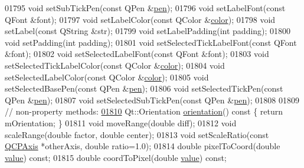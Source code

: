\begin{DoxyCode}
01795   \textcolor{keywordtype}{void} setSubTickPen(\textcolor{keyword}{const} QPen &\hyperlink{a00116_a1f13fffa0a0faac34ec342973e613a4a}{pen});
01796   \textcolor{keywordtype}{void} setLabelFont(\textcolor{keyword}{const} QFont &font);
01797   \textcolor{keywordtype}{void} setLabelColor(\textcolor{keyword}{const} QColor &\hyperlink{a00116_ae35093fbf4f645dcefd930ca8c68b622}{color});
01798   \textcolor{keywordtype}{void} setLabel(\textcolor{keyword}{const} QString &str);
01799   \textcolor{keywordtype}{void} setLabelPadding(\textcolor{keywordtype}{int} padding);
01800   \textcolor{keywordtype}{void} setPadding(\textcolor{keywordtype}{int} padding);
01801   \textcolor{keywordtype}{void} setSelectedTickLabelFont(\textcolor{keyword}{const} QFont &font);
01802   \textcolor{keywordtype}{void} setSelectedLabelFont(\textcolor{keyword}{const} QFont &font);
01803   \textcolor{keywordtype}{void} setSelectedTickLabelColor(\textcolor{keyword}{const} QColor &\hyperlink{a00116_ae35093fbf4f645dcefd930ca8c68b622}{color});
01804   \textcolor{keywordtype}{void} setSelectedLabelColor(\textcolor{keyword}{const} QColor &\hyperlink{a00116_ae35093fbf4f645dcefd930ca8c68b622}{color});
01805   \textcolor{keywordtype}{void} setSelectedBasePen(\textcolor{keyword}{const} QPen &\hyperlink{a00116_a1f13fffa0a0faac34ec342973e613a4a}{pen});
01806   \textcolor{keywordtype}{void} setSelectedTickPen(\textcolor{keyword}{const} QPen &\hyperlink{a00116_a1f13fffa0a0faac34ec342973e613a4a}{pen});
01807   \textcolor{keywordtype}{void} setSelectedSubTickPen(\textcolor{keyword}{const} QPen &\hyperlink{a00116_a1f13fffa0a0faac34ec342973e613a4a}{pen});
01808   
01809   \textcolor{comment}{// non-property methods:}
\hypertarget{a00116_source_l01810}{}\hyperlink{a00025_a57483f2f60145ddc9e63f3af53959265}{01810}   Qt::Orientation \hyperlink{a00025_a57483f2f60145ddc9e63f3af53959265}{orientation}()\textcolor{keyword}{ const }\{ \textcolor{keywordflow}{return} mOrientation; \}
01811   \textcolor{keywordtype}{void} moveRange(\textcolor{keywordtype}{double} diff);
01812   \textcolor{keywordtype}{void} scaleRange(\textcolor{keywordtype}{double} factor, \textcolor{keywordtype}{double} center);
01813   \textcolor{keywordtype}{void} setScaleRatio(\textcolor{keyword}{const} \hyperlink{a00025}{QCPAxis} *otherAxis, \textcolor{keywordtype}{double} ratio=1.0);
01814   \textcolor{keywordtype}{double} pixelToCoord(\textcolor{keywordtype}{double} \hyperlink{a00116_aee90379adb0307effb138f4871edbc5c}{value}) \textcolor{keyword}{const};
01815   \textcolor{keywordtype}{double} coordToPixel(\textcolor{keywordtype}{double} \hyperlink{a00116_aee90379adb0307effb138f4871edbc5c}{value}) \textcolor{keyword}{const};

\end{DoxyCode}

